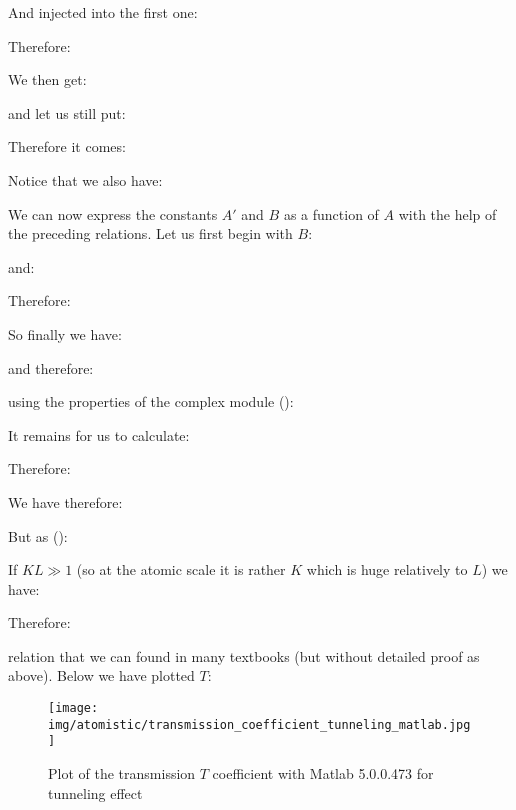 	\begin{tcolorbox}[colframe=black,colback=white,sharp corners]
	
	And injected into the first one:
	
	Therefore:
	
	We then get:
	
	and let us still put:
	
	Therefore it comes:
	
	Notice that we also have:
	
	\end{tcolorbox}
	
	
	\begin{tcolorbox}[colframe=black,colback=white,sharp corners]
	We can now express the constants $A'$ and $B$ as a function of $A$ with the help of the preceding relations. Let us first begin with $B$:
	
	and:
	
	Therefore:
	
	So finally we have:
	
	and therefore:
	\end{tcolorbox}
	
	
	\begin{tcolorbox}[colframe=black,colback=white,sharp corners]
	
	using the properties of the complex module ():
	
	It remains for us to calculate:
	
	Therefore:
	
	\end{tcolorbox}
	
	\begin{tcolorbox}[colframe=black,colback=white,sharp corners]
	
	We have therefore:
	
	But as ():
	
	If $KL\gg 1$ (so at the atomic scale it is rather $K$ which is huge relatively to $L$) we have:
	
	Therefore:
	
	relation that we can found in many textbooks (but without detailed proof as above). Below we have plotted $T$:
	\begin{figure}[H]
		\centering
		\texttt{[image: img/atomistic/transmission\_coefficient\_tunneling\_matlab.jpg]}	
		\caption{Plot of the transmission $T$ coefficient with Matlab 5.0.0.473 for tunneling effect}
	\end{figure}
	\end{tcolorbox}
	
